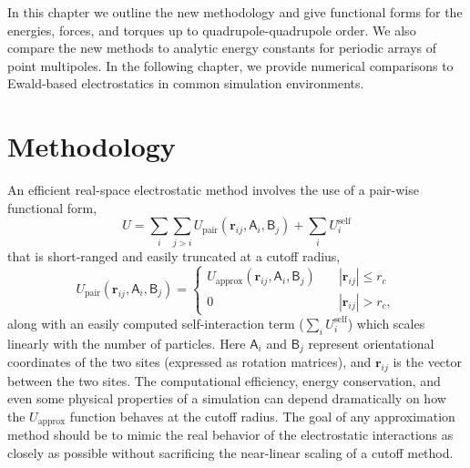 In this chapter we outline the new methodology and give functional forms
for the energies, forces, and torques up to quadrupole-quadrupole
order.  We also compare the new methods to analytic energy constants
for periodic arrays of point multipoles. In the following chapter, we
provide numerical comparisons to Ewald-based electrostatics in common
simulation environments.
\section{Methodology}
An efficient real-space electrostatic method involves the use of a
pair-wise functional form,
\begin{equation}
U = \sum_i \sum_{j>i} U_\mathrm{pair}(\mathbf{r}_{ij}, \mathsf{A}_i, \mathsf{B}_j) +
\sum_i U_i^\mathrm{self}
\end{equation}
that is short-ranged and easily truncated at a cutoff radius,
\begin{equation}
  U_\mathrm{pair}(\mathbf{r}_{ij},\mathsf{A}_i, \mathsf{B}_j) = \left\{
\begin{array}{ll}
U_\mathrm{approx} (\mathbf{r}_{ij}, \mathsf{A}_i, \mathsf{B}_j) & \quad \left| \mathbf{r}_{ij} \right| \le r_c \\
0 & \quad \left| \mathbf{r}_{ij} \right|  > r_c ,
\end{array}
\right.
\end{equation}
along with an easily computed self-interaction term ($\sum_i
U_i^\mathrm{self}$) which scales linearly with the number of
particles.  Here $\mathsf{A}_i$ and $\mathsf{B}_j$ represent orientational
coordinates of the two sites (expressed as rotation matrices), and $\mathbf{r}_{ij}$ is the vector
between the two sites.  The computational efficiency, energy
conservation, and even some physical properties of a simulation can
depend dramatically on how the $U_\mathrm{approx}$ function behaves at
the cutoff radius. The goal of any approximation method should be to
mimic the real behavior of the electrostatic interactions as closely
as possible without sacrificing the near-linear scaling of a cutoff
method.

